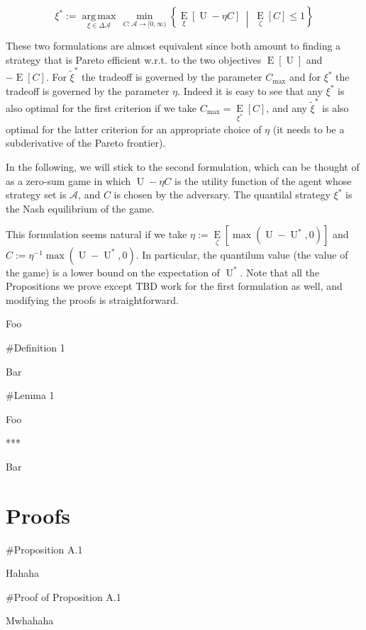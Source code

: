 \documentclass[a4paper]{article}
\newcommand{\AP}[1]{\left(#1\right)}
\newcommand{\AB}[1]{\left[#1\right]}
\newcommand{\ACM}[2]{\left\{#1\;\middle\vert\;#2\right\}}
\newcommand{\Ea}[2]{\underset{#1}{\operatorname{E}}\AB{#2}}
\newcommand{\Argmax}[1]{\underset{#1}{\operatorname{arg\,max}}\,}
\newcommand{\A}{\mathcal{A}}
\newcommand{\Ut}{\operatorname{U}}
\begin{document}
$$\xi^* := \Argmax{\xi \in \Delta\A}\min_{C:\A\rightarrow[0,\infty)}\ACM{\Ea{\xi}{\Ut-\eta C}}{\Ea{\zeta}{C} \leq 1}$$

These two formulations are almost equivalent since both amount to finding a strategy that is Pareto efficient w.r.t. to the two objectives $\Ea{}{\Ut}$ and $-\Ea{}{C}$. For $\tilde{\xi}^*$ the tradeoff is governed by the parameter $C_{\max}$ and for $\xi^*$ the tradeoff is governed by the parameter $\eta$. Indeed it is easy to see that any $\xi^*$ is also optimal for the first criterion if we take $C_{\max}=\Ea{\xi^*}{C}$, and any $\tilde{\xi}^*$ is also optimal for the latter criterion for an appropriate choice of $\eta$ (it needs to be a subderivative of the Pareto frontier).

In the following, we will stick to the second formulation, which can be thought of as a zero-sum game in which $\Ut-\eta C$ is the utility function of the agent whose strategy set is $\A$, and $C$ is chosen by the adversary. The quantilal strategy $\xi^*$ is the Nash equilibrium of the game.

This formulation seems natural if we take $\eta:=\Ea{\zeta}{\max\AP{\Ut-\Ut^*,0}}$ and $C:=\eta^{-1}\max\AP{\Ut-\Ut^*,0}$. In particular, the quantilum value (the value of the game) is a lower bound on the expectation of $\Ut^*$. Note that all the Propositions we prove except TBD work for the first formulation as well, and modifying the proofs is straightforward.

Foo

\#Definition 1

Bar

\#Lemma 1

Foo

***

Bar

\section{Proofs}

\#Proposition A.1

Hahaha

\#Proof of Proposition A.1

Mwhahaha
\end{document}
